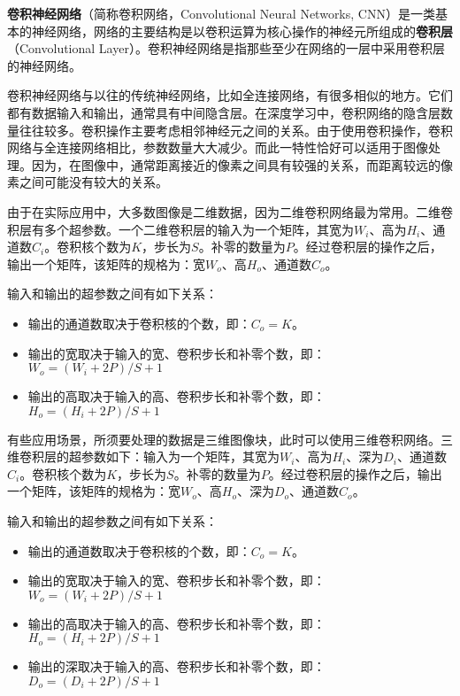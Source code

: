 

\textbf{卷积神经网络}（简称卷积网络，Convolutional Neural Networks, CNN）是一类基本的神经网络，网络的主要结构是以卷积运算为核心操作的神经元所组成的\textbf{卷积层}（Convolutional Layer）。卷积神经网络是指那些至少在网络的一层中采用卷积层的神经网络。

卷积神经网络与以往的传统神经网络，比如全连接网络，有很多相似的地方。它们都有数据输入和输出，通常具有中间隐含层。在深度学习中，卷积网络的隐含层数量往往较多。卷积操作主要考虑相邻神经元之间的关系。由于使用卷积操作，卷积网络与全连接网络相比，参数数量大大减少。而此一特性恰好可以适用于图像处理。因为，在图像中，通常距离接近的像素之间具有较强的关系，而距离较远的像素之间可能没有较大的关系。

由于在实际应用中，大多数图像是二维数据，因为二维卷积网络最为常用。二维卷积层有多个超参数。一个二维卷积层的输入为一个矩阵，其宽为$W_i$、高为$H_i$、通道数$C_i$。卷积核个数为$K$，步长为$S$。补零的数量为$P$。经过卷积层的操作之后，输出一个矩阵，该矩阵的规格为：宽$W_o$、高$H_o$、通道数$C_o$。

输入和输出的超参数之间有如下关系： \\
\begin{itemize}
\item 输出的通道数取决于卷积核的个数，即：$C_o=K$。
\item 输出的宽取决于输入的宽、卷积步长和补零个数，即：$W_o=(W_i+2P)/S+1$
\item 输出的高取决于输入的高、卷积步长和补零个数，即：$H_o=(H_i+2P)/S+1$
\end{itemize}

有些应用场景，所须要处理的数据是三维图像块，此时可以使用三维卷积网络。三维卷积层的超参数如下：输入为一个矩阵，其宽为$W_i$、高为$H_i$、深为$D_i$、通道数$C_i$。卷积核个数为$K$，步长为$S$。补零的数量为$P$。经过卷积层的操作之后，输出一个矩阵，该矩阵的规格为：宽$W_o$、高$H_o$、深为$D_o$、通道数$C_o$。

输入和输出的超参数之间有如下关系： \\
\begin{itemize}
\item 输出的通道数取决于卷积核的个数，即：$C_o=K$。
\item 输出的宽取决于输入的宽、卷积步长和补零个数，即：$W_o=(W_i+2P)/S+1$
\item 输出的高取决于输入的高、卷积步长和补零个数，即：$H_o=(H_i+2P)/S+1$
\item 输出的深取决于输入的高、卷积步长和补零个数，即：$D_o=(D_i+2P)/S+1$
\end{itemize}

